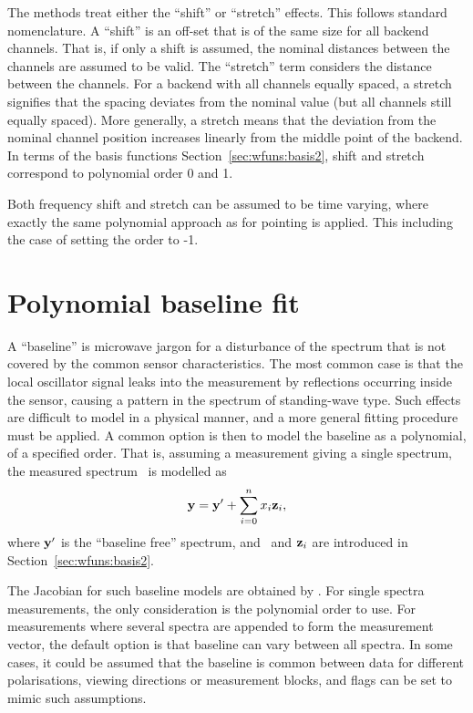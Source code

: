 The methods treat either the ``shift'' or ``stretch'' effects. This follows
standard nomenclature. A ``shift'' is an off-set that is of the same size for
all backend channels. That is, if only a shift is assumed, the nominal
distances between the channels are assumed to be valid. The ``stretch'' term
considers the distance between the channels. For a backend with all channels
equally spaced, a stretch signifies that the spacing deviates from the nominal
value (but all channels still equally spaced). More generally, a stretch means
that the deviation from the nominal channel position increases linearly from
the middle point of the backend. In terms of the basis functions
Section~\ref{sec:wfuns:basis2}, shift and stretch correspond to polynomial
order 0 and 1.

Both frequency shift and stretch can be assumed to be time varying, where
exactly the same polynomial approach as for pointing is applied. This
including the case of setting the order to -1.




\section{Polynomial baseline fit}
\label{sec:wfuns:polyfit}

A ``baseline'' is microwave jargon for a disturbance of the spectrum that is
not covered by the common sensor characteristics. The most common case is that
the local oscillator signal leaks into the measurement by reflections occurring
inside the sensor, causing a pattern in the spectrum of standing-wave type.
Such effects are difficult to model in a physical manner, and a more general
fitting procedure must be applied. A common option is then to model the
baseline as a polynomial, of a specified order. That is, assuming a measurement
giving a single spectrum, the measured spectrum \MsrVct\ is modelled as
\begin{equation}
  \label{eq:polyfit}
  \mathbf{y} = \mathbf{y}' + \sum_{i=0}^n x_{i}\mathbf{z}_i,
\end{equation}
where $\mathbf{y}'$ is the ``baseline free'' spectrum, and \ and
$\mathbf{z}_i$ are introduced in Section~\ref{sec:wfuns:basis2}.

The Jacobian for such baseline models are obtained by
. For single spectra measurements, the only
consideration is the polynomial order to use. For measurements where several
spectra are appended to form the measurement vector, the default option is that
baseline can vary between all spectra. In some cases, it could be assumed that
the baseline is common between data for different polarisations, viewing
directions or measurement blocks, and flags can be set to mimic such
assumptions.

